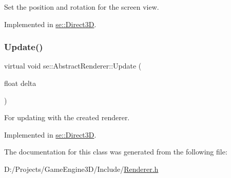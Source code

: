 Set the position and rotation for the screen view. 

Implemented in \mbox{\hyperlink{classse_1_1_direct3_d_a0294b31c151540af98c78d1e33cb369a}{se\+::\+Direct3D}}.

\mbox{\label{classse_1_1_abstract_renderer_aae49e7417663d6a5aca34a2bb37b4b28}} 
\subsubsection{\texorpdfstring{Update()}{Update()}}
{\footnotesize\ttfamily virtual void se\+::\+Abstract\+Renderer\+::\+Update (\begin{DoxyParamCaption}\item[{float}]{delta }\end{DoxyParamCaption})\hspace{0.3cm}{\ttfamily [pure virtual]}}

For updating with the created renderer. 

Implemented in \mbox{\hyperlink{classse_1_1_direct3_d_a39934c194406f108a992d82a4d265381}{se\+::\+Direct3D}}.



The documentation for this class was generated from the following file\+:\begin{DoxyCompactItemize}
\item 
D\+:/\+Projects/\+Game\+Engine3\+D/\+Include/\mbox{\hyperlink{_renderer_8h}{Renderer.\+h}}\end{DoxyCompactItemize}
